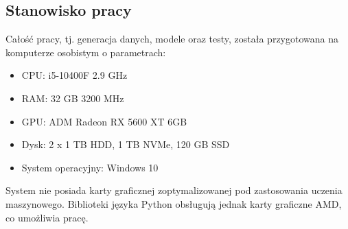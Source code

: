 \subsection{Stanowisko pracy}
Całość pracy, tj. generacja danych, modele oraz testy, została przygotowana na komputerze osobistym o parametrach:

\begin{itemize}[label=-,labelsep=0.4cm,leftmargin=0.6cm]
\item CPU: i5-10400F 2.9 GHz
\item RAM: 32 GB 3200 MHz
\item GPU: ADM Radeon RX 5600 XT 6GB
\item Dysk: 2 x 1 TB HDD, 1 TB NVMe, 120 GB SSD
\item System operacyjny: Windows 10
\end{itemize}
System nie posiada karty graficznej zoptymalizowanej pod zastosowania uczenia maszynowego.
Biblioteki języka Python obsługują jednak karty graficzne AMD, co umożliwia pracę.